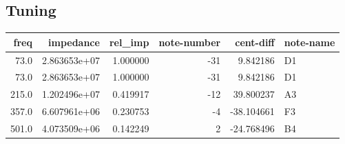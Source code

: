 \documentclass{article}
\begin{document}
\subsection{Tuning}
\begin{centering}
\begin{tabular}{rrrrrl}
\toprule
 freq &    impedance &  rel\_imp &  note-number &  cent-diff & note-name \\
\midrule
 73.0 & 2.863653e+07 & 1.000000 &          -31 &   9.842186 &        D1 \\
 73.0 & 2.863653e+07 & 1.000000 &          -31 &   9.842186 &        D1 \\
215.0 & 1.202496e+07 & 0.419917 &          -12 &  39.800237 &        A3 \\
357.0 & 6.607961e+06 & 0.230753 &           -4 & -38.104661 &        F3 \\
501.0 & 4.073509e+06 & 0.142249 &            2 & -24.768496 &        B4 \\
\bottomrule
\end{tabular}
\end{centering}
\end{document}
